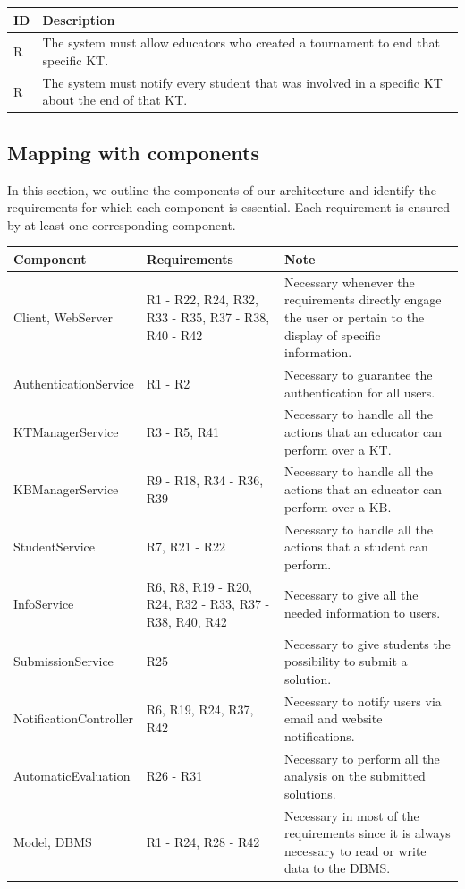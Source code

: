 \documentclass[11pt]{report}
\newcounter{rcounter}
\newcommand{\rc}{
    \addtocounter{rcounter}{1}
    R\arabic{rcounter}
}
\begin{document}
\begin{longtable}[h] {|p{10mm}|p{130mm}|}
    \hline
    \rowcolor{gray!20}
    \textbf{ID} & \textbf{Description} \\ \hline
    \rc & The system must allow educators who created a tournament to end that specific KT\@.
    \\ \hline
    \rc & The system must notify every student that was involved in a specific KT about the end of that KT\@.
    \\ \hline
\end{longtable}

\subsection{Mapping with components}
In this section, we outline the components of our architecture and identify the requirements for which each component is essential.
Each requirement is ensured by at least one corresponding component.

\begin{longtable}[h] {|p{40mm}|p{50mm}|p{50mm}|}
    \hline
    \rowcolor{gray!20}
    \textbf{Component} & \textbf{Requirements} & \textbf{Note} \\ \hline
    Client, WebServer &
    R1 - R22, R24, R32, R33 - R35, R37 - R38, R40 - R42 &
    Necessary whenever the requirements directly engage the user or pertain to the display of specific information.
    \\ \hline
    AuthenticationService &
    R1 - R2 &
    Necessary to guarantee the authentication for all users.
    \\ \hline
    KTManagerService &
    R3 - R5, R41 &
    Necessary to handle all the actions that an educator can perform over a KT.
    \\ \hline
    KBManagerService &
    R9 - R18, R34 - R36, R39 &
    Necessary to handle all the actions that an educator can perform over a KB.
    \\ \hline
    StudentService &
    R7, R21 - R22 &
    Necessary to handle all the actions that a student can perform.
    \\ \hline
    InfoService &
    R6, R8, R19 - R20, R24, R32 - R33, R37 - R38, R40, R42 &
    Necessary to give all the needed information to users.
    \\ \hline
    SubmissionService &
    R25 &
    Necessary to give students the possibility to submit a solution.
    \\ \hline
    NotificationController &
    R6, R19, R24, R37, R42 &
    Necessary to notify users via email and website notifications.
    \\ \hline
    AutomaticEvaluation &
    R26 - R31 &
    Necessary to perform all the analysis on the submitted solutions.
    \\ \hline
    Model, DBMS &
    R1 - R24, R28 - R42 &
    Necessary in most of the requirements since it is always necessary to read or write data to the DBMS.
    \\ \hline
\end{longtable}
\end{document}
